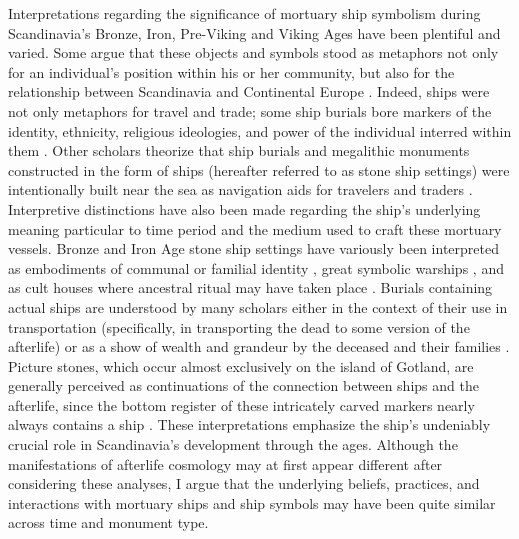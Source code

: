 Interpretations regarding the significance of mortuary ship symbolism during Scandinavia’s Bronze, Iron, Pre-Viking and Viking Ages have been plentiful and varied. Some argue that these objects and symbols stood as metaphors not only for an individual’s position within his or her community, but also for the relationship between Scandinavia and Continental Europe \parencite[388]{Ballard_2004}.
Indeed, ships were not only metaphors for travel and trade; some ship burials bore markers of the identity, ethnicity, religious ideologies, and power of the individual interred within them \parencite[265]{Price_2008}.
Other scholars theorize that ship burials and megalithic monuments constructed in the form of ships (hereafter referred to as stone ship settings) were intentionally built near the sea as navigation aids for travelers and traders \parencite[388]{Ballard_2004}.
Interpretive distinctions have also been made regarding the ship’s underlying meaning particular to time period and the medium used to craft these mortuary vessels. Bronze and Iron Age stone ship settings have variously been interpreted as embodiments of communal or familial identity \parencite[390]{Ballard_2004}
, great symbolic warships \parencite[394--396]{Skoglund_2008},
and as cult houses where ancestral ritual may have taken place \parencite[97]{Bradley_2010}. Burials containing actual ships are understood by many scholars either in the context of their use in transportation (specifically, in transporting the dead to some version of the afterlife) or as a show of wealth and grandeur by the deceased and their families \parencite[265]{Price_2008}.
Picture stones, which occur almost exclusively on the island of Gotland, are generally perceived as continuations of the connection between ships and the afterlife, since the bottom register of these intricately carved markers nearly always contains a ship \parencite[265]{Price_2008}. These interpretations emphasize the ship’s undeniably crucial role in Scandinavia’s development through the ages. Although the manifestations of afterlife cosmology may at first appear different after considering these analyses, I argue that the underlying beliefs, practices, and interactions with mortuary ships and ship symbols may have been quite similar across time and monument type.


